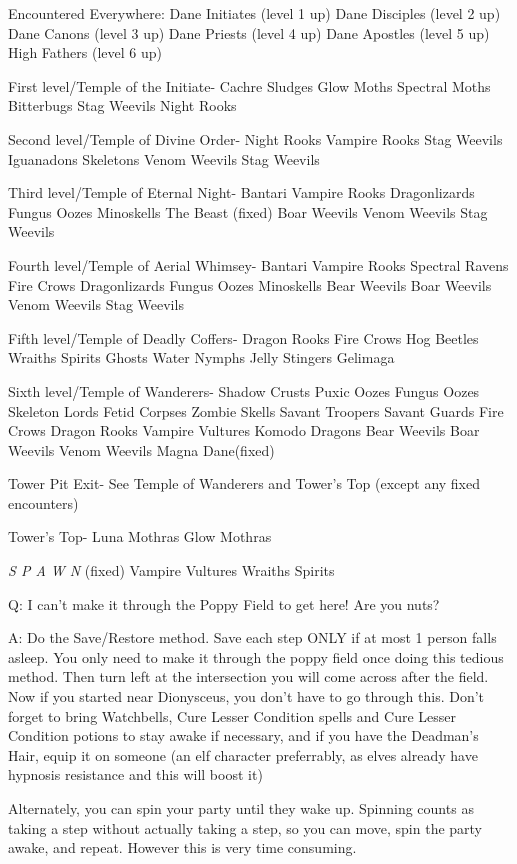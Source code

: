 \documentclass[12pt]{article}
\begin{document}
Encountered Everywhere: Dane Initiates (level 1 up) Dane Disciples
(level 2 up) Dane Canons (level 3 up) Dane Priests (level 4 up) Dane
Apostles (level 5 up) High Fathers (level 6 up)

First level/Temple of the Initiate- Cachre Sludges Glow Moths Spectral
Moths Bitterbugs Stag Weevils Night Rooks

Second level/Temple of Divine Order- Night Rooks Vampire Rooks Stag
Weevils Iguanadons Skeletons Venom Weevils Stag Weevils

Third level/Temple of Eternal Night- Bantari Vampire Rooks Dragonlizards
Fungus Oozes Minoskells The Beast (fixed) Boar Weevils Venom Weevils
Stag Weevils

Fourth level/Temple of Aerial Whimsey- Bantari Vampire Rooks Spectral
Ravens Fire Crows Dragonlizards Fungus Oozes Minoskells Bear Weevils
Boar Weevils Venom Weevils Stag Weevils

Fifth level/Temple of Deadly Coffers- Dragon Rooks Fire Crows Hog
Beetles Wraiths Spirits Ghosts Water Nymphs Jelly Stingers Gelimaga

Sixth level/Temple of Wanderers- Shadow Crusts Puxic Oozes Fungus Oozes
Skeleton Lords Fetid Corpses Zombie Skells Savant Troopers Savant Guards
Fire Crows Dragon Rooks Vampire Vultures Komodo Dragons Bear Weevils
Boar Weevils Venom Weevils Magna Dane(fixed)

Tower Pit Exit- See Temple of Wanderers and Tower's Top (except any
fixed encounters)

Tower's Top- Luna Mothras Glow Mothras

\emph{S P A W N} (fixed) Vampire Vultures Wraiths Spirits

Q: I can't make it through the Poppy Field to get here! Are you nuts?

A: Do the Save/Restore method. Save each step ONLY if at most 1 person
falls asleep. You only need to make it through the poppy field once
doing this tedious method. Then turn left at the intersection you will
come across after the field. Now if you started near Dionysceus, you
don't have to go through this. Don't forget to bring Watchbells, Cure
Lesser Condition spells and Cure Lesser Condition potions to stay awake
if necessary, and if you have the Deadman's Hair, equip it on someone
(an elf character preferrably, as elves already have hypnosis resistance
and this will boost it)

Alternately, you can spin your party until they wake up.  Spinning counts
as taking a step without actually taking a step, so you can move, spin the
party awake, and repeat.  However this is very time consuming.
\end{document}
